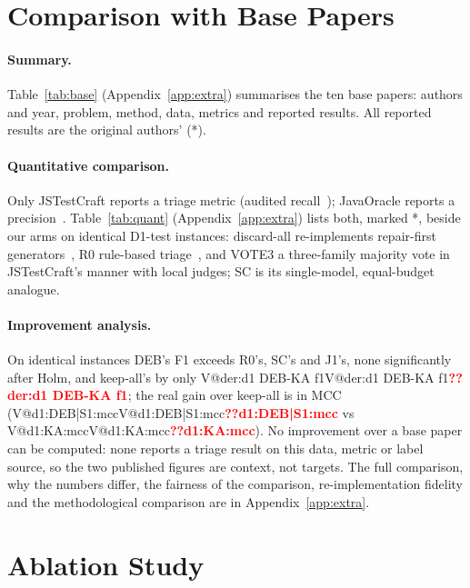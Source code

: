 \documentclass[pdflatex,iicol,sn-mathphys-num]{sn-jnl}
\makeatletter
\newcommand{\V}[1]{\ifcsname V@#1\endcsname\csname V@#1\endcsname\else\textbf{\textcolor{red}{??#1}}\fi}
\makeatother
\begin{document}
\section{Comparison with Base Papers}\label{sec:comparison}

\paragraph{Summary.} Table~\ref{tab:base} (Appendix~\ref{app:extra}) summarises the ten base papers: authors and year, problem, method, data, metrics and reported results. All reported results are the original authors' (*).


\paragraph{Quantitative comparison.} Only JSTestCraft reports a triage metric (audited recall~\cite{liu2026jstestcraft}); JavaOracle reports a precision~\cite{fu2026javaoracle}. Table~\ref{tab:quant} (Appendix~\ref{app:extra}) lists both, marked *, beside our arms on identical D1-test instances: discard-all re-implements repair-first generators~\cite{gu2026testart,hayet2025chatassert}, R0 rule-based triage~\cite{maddila2026agentic,herzig2015alarms}, and VOTE3 a three-family majority vote in JSTestCraft's manner with local judges; SC is its single-model, equal-budget analogue.


\paragraph{Improvement analysis.} On identical instances DEB's F1 exceeds R0's, SC's and J1's, none significantly after Holm, and keep-all's by only \V{der:d1 DEB-KA f1}; the real gain over keep-all is in MCC (\V{d1:DEB|S1:mcc} vs \V{d1:KA:mcc}). No improvement over a base paper can be computed: none reports a triage result on this data, metric or label source, so the two published figures are context, not targets. The full comparison, why the numbers differ, the fairness of the comparison, re-implementation fidelity and the methodological comparison are in Appendix~\ref{app:extra}.

\section{Ablation Study}\label{sec:ablation}
\end{document}
